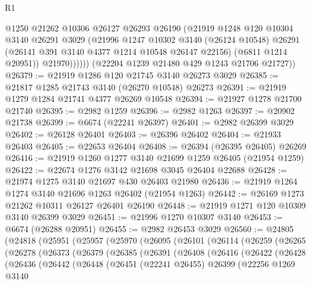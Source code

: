 \begin{lexlean}{R1}
\begin{coremodule}
                @1250
                @21262
                @10306
                @26127
                @26293
                @26190
                (@21919
                  @1248
                  @120
                  @10304
                  @3140
                  @26291
                  @3029
                  (@21996
                    @1247
                    @10302
                    @3140
                    (@26124 @10548)
                    @26291
                    (@26141 @391 @3140 @4377 @1214 @10548 @26147 @22156)
                    (@6811 @1214 @20951))
                  @21970))))))
      (@22204 @1239 @21480 @429 @1243 @21706 @21727))
@26379 := @21919 @1286 @120 @21745 @3140 @26273 @3029
@26385 := @21817 @1285 @21743 @3140 (@26270 @10548) @26273
@26391 := @21919 @1279 @1284 @21741 @4377 @26269 @10548
@26394 := @21927 @1278 @21700 @21740
@26395 := @2982 @1259
@26396 := @2982 @1263
@26397 := @20902 @21738
@26399 := @6674 (@22241 @26397)
@26401 := @2982 @26399 @3029
@26402 := @26128 @26401
@26403 := @26396 @26402
@26404 := @21933 @26403
@26405 := @22653 @26404
@26408 := @26394 (@26395 @26405) @26269
@26416 := @21919 @1260 @1277 @3140 @21699 @1259 @26405 (@21954 @1259)
@26422 := @22674 @1276 @3142 @21698 @3045 @26404 @22688
@26428 := @21974 @1275 @3140 @21697 @430 @26403 @21980
@26436 := @21919 @1264 @1274 @3140 @21696 @1263 @26402 (@21954 @1263)
@26442 := @26169 @1273 @21262 @10311 @26127 @26401 @26190
@26448 := @21919 @1271 @120 @10309 @3140 @26399 @3029
@26451 := @21996 @1270 @10307 @3140
@26453 := @6674 (@26288 @20951)
@26455 := @2982 @26453 @3029
@26560 := @24805
    (@24818
      (@25951
        (@25957
          (@25970
            (@26095
              (@26101
                (@26114
                  (@26259
                    (@26265
                      (@26278
                        (@26373
                          (@26379
                            (@26385
                              (@26391
                                (@26408
                                  (@26416
                                    (@26422
                                      (@26428
                                        (@26436
                                          (@26442
                                            (@26448
                                              (@26451
                                                (@22241 @26455)
                                                @26399
                                                (@22256
                                                  @1269
                                                  @3140

\end{coremodule}
\end{lexlean}
